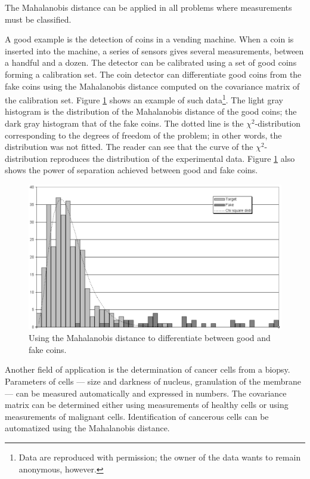 \documentclass[twoside]{book}
\begin{document}
 \noindent The Mahalanobis distance can
be applied in all problems where measurements must be classified.

A good example is the detection of coins in a vending machine.
When a coin is inserted into the machine, a series of sensors
gives several measurements, between a handful and a dozen. The
detector can be calibrated using a set of good coins forming a
calibration set. The coin detector can differentiate good coins
from the fake coins using the Mahalanobis distance computed on the
covariance matrix of the calibration set. Figure
\ref{fig:mahalanobis} shows an example of such data\footnote{Data
are reproduced with permission; the owner of the data wants to
remain anonymous, however.}. The light gray histogram is the
distribution of the Mahalanobis distance of the good coins; the
dark gray histogram that of the fake coins. The dotted line is the
$\chi^2$-distribution corresponding to the degrees of freedom of
the problem; in other words, the distribution was not fitted. The
reader can see that the curve of the $\chi^2$-distribution
reproduces the distribution of the experimental data. Figure
\ref{fig:mahalanobis} also shows the power of separation achieved
between good and fake coins.
\begin{figure}
\centering\includegraphics[width=12cm]{Figures/Mahalanobis}
\caption{Using the Mahalanobis distance to differentiate between
good and fake coins.}\label{fig:mahalanobis}
\end{figure}


Another field of application is the determination of cancer cells
from a biopsy. Parameters of cells --- size and darkness of
nucleus, granulation of the membrane --- can be measured
automatically and expressed in numbers. The covariance matrix can
be determined either using measurements of healthy cells or using
measurements of malignant cells. Identification of cancerous cells
can be automatized using the Mahalanobis distance.
\end{document}
